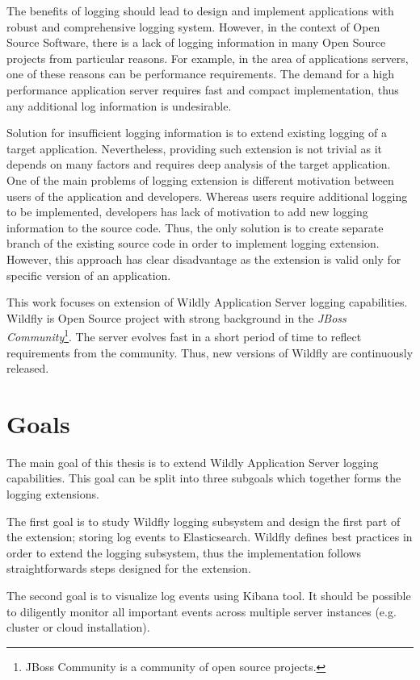 \documentclass[12pt,oneside]{fithesis2}
\begin{document}
The benefits of logging should lead to design and implement applications with robust and comprehensive logging system. However, in the context of Open Source Software, there is a lack of logging information in many Open Source projects from particular reasons. For example, in the area of applications servers, one of these reasons can be performance requirements. The demand for a high performance application server requires fast and compact implementation, thus any additional log information is undesirable.

Solution for insufficient logging information is to extend existing logging of a target application. Nevertheless, providing such extension is not trivial as it depends on many factors and requires deep analysis of the target application. One of the main problems of logging extension is different motivation between users of the application and developers. Whereas users require additional logging to be implemented, developers has lack of motivation to add new logging information to the source code. Thus, the only solution is to create separate branch of the existing source code in order to implement logging extension. However, this approach has clear disadvantage as the extension is valid only for specific version of an application.

This work focuses on extension of Wildly Application Server logging capabilities. Wildfly is Open Source project with strong background in the \textit{JBoss Community}\footnote{JBoss Community is a community of open source projects.}. The server evolves fast in a short period of time to reflect requirements from the community. Thus, new versions of Wildfly are continuously released.

\section{Goals}
The main goal of this thesis is to extend Wildly Application Server logging capabilities. This goal can be split into three subgoals which together forms the logging extensions.

The first goal is to study Wildfly logging subsystem and design the first part of the extension; storing log events to Elasticsearch. Wildfly defines best practices in order to extend the logging subsystem, thus the implementation follows straightforwards steps designed for the extension.

The second goal is to visualize log events using Kibana tool. It should be possible to diligently monitor all important events across multiple server instances (e.g. cluster or cloud installation).
\end{document}
